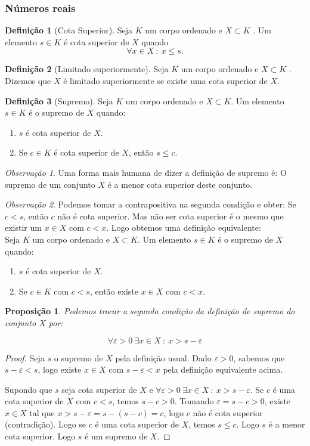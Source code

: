 \documentclass{article}
\theoremstyle{plain}
\newtheorem{prop}{Proposição}[section]
\theoremstyle{definition}
\newtheorem{definicao}{Definição}[section]
\theoremstyle{remark}
\newtheorem{obs}{Observação}[section]
\begin{document}
   \subsubsection{Números reais}
\begin{definicao}[Cota Superior]
	Seja $K$ um corpo ordenado e $X\subset K$ . Um elemento $s\in K$ é cota superior de $X$ quando $$ \forall x\in X \: : \: x\leq s.$$
\end{definicao}
\begin{definicao}[Limitado superiormente]
	
	Seja $K$ um corpo ordenado e $X\subset K$ . Dizemos que $X$ é limitado superiormente se existe uma cota superior de $X$.
\end{definicao}
\begin{definicao}[Supremo]
	Seja $K$ um corpo ordenado e $X\subset K$. Um elemento $s\in K$ é o supremo de $X$ quando:
	\begin{enumerate}
		\item $s$ é cota superior de $X$.
		\item Se $c\in K$ é cota superior de $X$, então $s\leq c$.
	\end{enumerate}
\end{definicao}
\begin{obs}
	Uma forma mais humana de dizer a definição de supremo é: O supremo de um conjunto $X$ é a menor cota superior deste conjunto.
\end{obs}
\begin{obs}
	Podemos tomar a contrapositiva na segunda condição e obter: Se $c < s$, então $c$ não é cota superior. Mas não ser cota superior é o mesmo que existir um $x\in X$ com $c< x$. Logo obtemos uma definição equivalente:\\
	Seja $K$ um corpo ordenado e $X\subset K$. Um elemento $s\in K$ é o supremo de $X$ quando:
	\begin{enumerate}
		\item $s$ é cota superior de $X$.
		\item Se $c\in K$ com $c < s$, então existe $x\in X$ com  $c< x$.
	\end{enumerate}
\end{obs}
\begin{prop}
	Podemos trocar a segunda condição da definição de supremo do conjunto $X$ por:
	
	$$\forall \varepsilon>0 \: \exists x\in X \: : \: x > s- \varepsilon $$
\end{prop}
\begin{proof}
	Seja $s$  o supremo de $X$ pela definição usual. Dado $\varepsilon >0$, sabemos que $s - \varepsilon < s$, logo existe $x\in X$ com $s-\varepsilon < x$ pela definição equivalente acima.

	Supondo que $s$ seja cota superior de $X$ e $\forall \varepsilon>0 \: \exists x\in X \: : \: x > s- \varepsilon $. Se $c$ é uma cota superior de $X$ com $c < s$, temos $s - c > 0 $. Tomando $\varepsilon = s-c>0$, existe $x\in X$ tal que $x > s-\varepsilon = s-(s-c) = c$, logo $c$ não é cota superior (contradição). Logo se $c$ é uma cota superior de $X$, temos $s \leq c$. Logo $s$ é  a menor cota superior. Logo $s$ é um supremo de $X$.
\end{proof}
\end{document}

